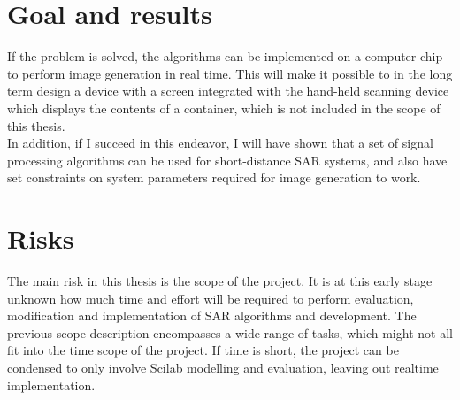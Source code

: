 \documentclass{chi2012}
\begin{document}
\section{Goal and results}
If the problem is solved, the algorithms can be implemented on a computer chip to perform image generation in real time. This will make it possible to in the long term design a device with a screen integrated with the hand-held scanning device which displays the contents of a container, which is not included in the scope of this thesis.
\\
In addition, if I succeed in this endeavor, I will have shown that a set of signal processing algorithms can be used for short-distance SAR systems, and also have set constraints on system parameters required for image generation to work.

\section{Risks}
The main risk in this thesis is the scope of the project. It is at this early stage unknown how much time and effort will be required to perform evaluation, modification and implementation of SAR algorithms and development. The previous scope description encompasses a wide range of tasks, which might not all fit into the time scope of the project. If time is short, the project can be condensed to only involve Scilab modelling and evaluation, leaving out realtime implementation.
\end{document}
